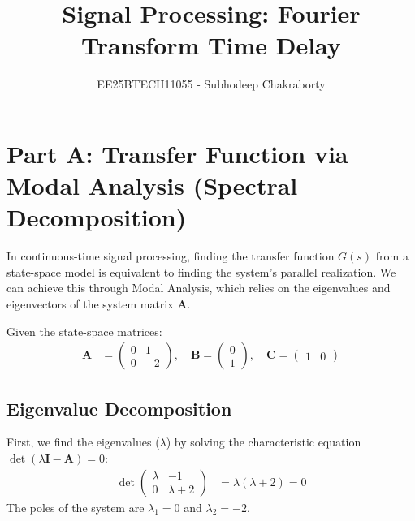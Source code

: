 \documentclass[journal,12pt,onecolumn]{IEEEtran}
\theoremstyle{remark}
\begin{document}

\vspace{3cm}

\title{Signal Processing: Fourier Transform Time Delay}
\author{EE25BTECH11055 - Subhodeep Chakraborty}
\maketitle
\hrulefill
\bigskip

\renewcommand{\thefigure}{\theenumi}
\renewcommand{\thetable}{\theenumi}

\section{Part A: Transfer Function via Modal Analysis (Spectral Decomposition)}

In continuous-time signal processing, finding the transfer function $G(s)$ from a state-space model is equivalent to finding the system's parallel realization. We can achieve this through Modal Analysis, which relies on the eigenvalues and eigenvectors of the system matrix $\mathbf{A}$.

Given the state-space matrices:
\begin{align*}
\mathbf{A} &= \begin{pmatrix} 0 & 1 \\ 0 & -2 \end{pmatrix}, \quad \mathbf{B} = \begin{pmatrix} 0 \\ 1 \end{pmatrix}, \quad \mathbf{C} = \begin{pmatrix} 1 & 0 \end{pmatrix}
\end{align*}

\subsection{Eigenvalue Decomposition}
First, we find the eigenvalues ($\lambda$) by solving the characteristic equation $\det(\lambda\mathbf{I} - \mathbf{A}) = 0$:
\begin{align*}
\det \begin{pmatrix} \lambda & -1 \\ 0 & \lambda + 2 \end{pmatrix} &= \lambda(\lambda + 2) = 0
\end{align*}
The poles of the system are $\lambda_1 = 0$ and $\lambda_2 = -2$.
\end{document}
